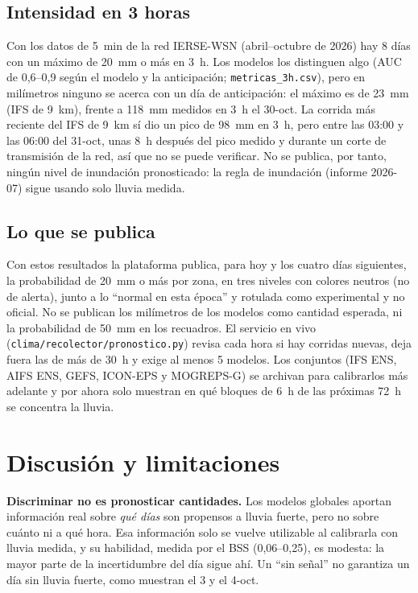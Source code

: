 \documentclass{sosg-informe}
\begin{document}
\subsection{Intensidad en 3 horas}
Con los datos de 5~min de la red IERSE-WSN (abril--octubre de 2026) hay 8 días con un máximo de 20~mm o más en 3~h. Los modelos los distinguen algo (AUC de 0,6--0,9 según el modelo y la anticipación; \texttt{metricas\_3h.csv}), pero en milímetros ninguno se acerca con un día de anticipación: el máximo es de 23~mm (IFS de 9~km), frente a 118~mm medidos en 3~h el 30-oct. La corrida más reciente del IFS de 9~km sí dio un pico de 98~mm en 3~h, pero entre las 03:00 y las 06:00 del 31-oct, unas 8~h después del pico medido y durante un corte de transmisión de la red, así que no se puede verificar. No se publica, por tanto, ningún nivel de inundación pronosticado: la regla de inundación (informe 2026-07) sigue usando solo lluvia medida.

\subsection{Lo que se publica}
Con estos resultados la plataforma publica, para hoy y los cuatro días siguientes, la probabilidad de 20~mm o más por zona, en tres niveles con colores neutros (no de alerta), junto a lo \enquote{normal en esta época} y rotulada como experimental y no oficial. No se publican los milímetros de los modelos como cantidad esperada, ni la probabilidad de 50~mm en los recuadros. El servicio en vivo (\texttt{clima/recolector/pronostico.py}) revisa cada hora si hay corridas nuevas, deja fuera las de más de 30~h y exige al menos 5 modelos. Los conjuntos (IFS ENS, AIFS ENS, GEFS, ICON-EPS y MOGREPS-G) se archivan para calibrarlos más adelante y por ahora solo muestran en qué bloques de 6~h de las próximas 72~h se concentra la lluvia.

\section{Discusión y limitaciones}

\textbf{Discriminar no es pronosticar cantidades.} Los modelos globales aportan información real sobre \emph{qué días} son propensos a lluvia fuerte, pero no sobre cuánto ni a qué hora. Esa información solo se vuelve utilizable al calibrarla con lluvia medida, y su habilidad, medida por el BSS (0,06--0,25), es modesta: la mayor parte de la incertidumbre del día sigue ahí. Un \enquote{sin señal} no garantiza un día sin lluvia fuerte, como muestran el 3 y el 4-oct.
\end{document}
